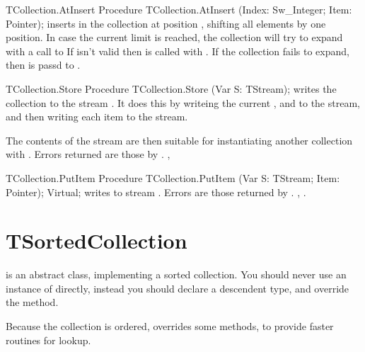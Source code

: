 \begin{procedure}{TCollection.AtInsert}
\Declaration
Procedure TCollection.AtInsert (Index: Sw\_Integer; Item: Pointer);
\Description
{} inserts  in the collection at position ,
shifting all elements by one position. In case the current limit is reached,
the collection will try to expand with a call to 
\Errors
If  isn't valid then  is called
with . If the collection fails to expand, then
 is passd to .
\SeeAlso
{}
\end{procedure}


\begin{procedure}{TCollection.Store}
\Declaration
Procedure TCollection.Store (Var S: TStream);
\Description
{} writes the collection to the stream . It does
this by writeing the current ,  and 
to the stream, and then writing each item to the stream.

The contents of the stream are then suitable for instantiating another
collection with .
\Errors
Errors returned are those by .
\SeeAlso
{}, 
\end{procedure}


\begin{procedure}{TCollection.PutItem}
\Declaration
Procedure TCollection.PutItem (Var S: TStream; Item: Pointer); Virtual;
\Description
{} writes  to stream . 
\Errors
Errors are those returned by .
\SeeAlso
{}, .
\end{procedure}


\section{TSortedCollection}
\label{se:TSortedCollection}

 is an abstract class, implementing a sorted
collection. You should never use an instance of 
directly, instead you should declare a descendent type, and override the
 method.

Because the collection is ordered,  overrides some
 methods, to provide faster routines for lookup.

